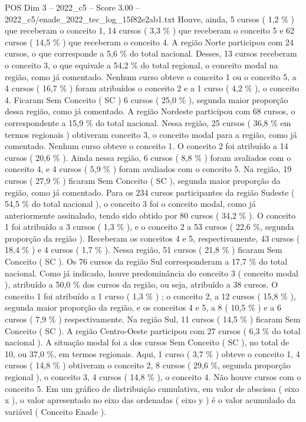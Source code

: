 \begin{textsample}{POS Dim 3 – 2022\_c5 – Score 3.00 – 2022\_c5/enade\_2022\_tec\_log\_15f82e2ab1.txt}
Houve, ainda, 5 cursos ( 1,2 \% ) que receberam o conceito 1, 14 cursos ( 3,3 \% ) que receberam o conceito 5 e 62 cursos ( 14,5 \% ) que receberam o conceito 4.
A região Norte participou com 24 cursos, o que corresponde a 5,6 \% do total nacional.
Desses, 13 cursos receberam o conceito 3, o que equivale a 54,2 \% do total regional, o conceito modal na região, como já comentado.
Nenhum curso obteve o conceito 1 ou o conceito 5, a 4 cursos ( 16,7 \% ) foram atribuídos o conceito 2 e a 1 curso ( 4,2 \% ), o conceito 4.
Ficaram Sem Conceito ( SC ) 6 cursos ( 25,0 \% ), segunda maior proporção dessa região, como já comentado.
A região Nordeste participou com 68 cursos, o correspondente a 15,9 \% do total nacional.
Nessa região, 25 cursos ( 36,8 \% em termos regionais ) obtiveram conceito 3, o conceito modal para a região, como já comentado.
Nenhum curso obteve o conceito 1.
O conceito 2 foi atribuído a 14 cursos ( 20,6 \% ).
Ainda nessa região, 6 cursos ( 8,8 \% ) foram avaliados com o conceito 4, e 4 cursos ( 5,9 \% ) foram avaliados com o conceito 5.
Na região, 19 cursos ( 27,9 \% ) ficaram Sem Conceito ( SC ), segunda maior proporção da região, como já comentado.
Para os 234 cursos participantes da região Sudeste ( 54,5 \% do total nacional ), o conceito 3 foi o conceito modal, como já anteriormente assinalado, tendo sido obtido por 80 cursos ( 34,2 \% ).
O conceito 1 foi atribuído a 3 cursos ( 1,3 \% ), e o conceito 2 a 53 cursos ( 22,6 \%, segunda proporção da região ).
Receberam os conceitos 4 e 5, respectivamente, 43 cursos ( 18,4 \% ) e 4 cursos ( 1,7 \% ).
Nessa região, 51 cursos ( 21,8 \% ) ficaram Sem Conceito ( SC ).
Os 76 cursos da região Sul corresponderam a 17,7 \% do total nacional.
Como já indicado, houve predominância do conceito 3 ( conceito modal ), atribuído a 50,0 \% dos cursos da região, ou seja, atribuído a 38 cursos.
O conceito 1 foi atribuído a 1 curso ( 1,3 \% ) ; o conceito 2, a 12 cursos ( 15,8 \% ), segunda maior proporção da região, e os conceitos 4 e 5, a 8 ( 10,5 \% ) e a 6 cursos ( 7,9 \% ) respectivamente.
Na região Sul, 11 cursos ( 14,5 \% ) ficaram Sem Conceito ( SC ).
A região Centro-Oeste participou com 27 cursos ( 6,3 \% do total nacional ).
A situação modal foi a dos cursos Sem Conceito ( SC ), no total de 10, ou 37,0 \%, em termos regionais.
Aqui, 1 curso ( 3,7 \% ) obteve o conceito 1, 4 cursos ( 14,8 \% ) obtiveram o conceito 2, 8 cursos ( 29,6 \%, segunda proporção regional ), o conceito 3, 4 cursos ( 14,8 \% ), o conceito 4.
Não houve cursos com o conceito 5.
Em um gráfico de distribuição cumulativa, em valor de abscissa ( eixo x ), o valor apresentado no eixo das ordenadas ( eixo y ) é o valor acumulado da variável ( Conceito Enade ).

\end{textsample}

